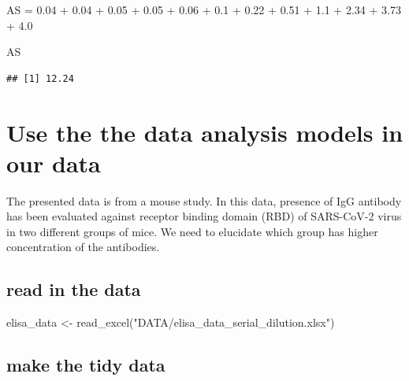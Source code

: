 \documentclass[
]{book}
\newenvironment{Shaded}{\begin{snugshade}}{\end{snugshade}}
\newcommand{\FloatTok}[1]{\textcolor[rgb]{0.00,0.00,0.81}{#1}}
\newcommand{\FunctionTok}[1]{\textcolor[rgb]{0.00,0.00,0.00}{#1}}
\newcommand{\NormalTok}[1]{#1}
\newcommand{\OtherTok}[1]{\textcolor[rgb]{0.56,0.35,0.01}{#1}}
\newcommand{\SpecialCharTok}[1]{\textcolor[rgb]{0.00,0.00,0.00}{#1}}
\newcommand{\StringTok}[1]{\textcolor[rgb]{0.31,0.60,0.02}{#1}}
\begin{document}
\begin{Shaded}
\begin{Highlighting}[]
\NormalTok{AS }\OtherTok{=} \FloatTok{0.04} \SpecialCharTok{+} \FloatTok{0.04} \SpecialCharTok{+} \FloatTok{0.05} \SpecialCharTok{+} \FloatTok{0.05} \SpecialCharTok{+} \FloatTok{0.06} \SpecialCharTok{+} \FloatTok{0.1} \SpecialCharTok{+} \FloatTok{0.22} \SpecialCharTok{+} \FloatTok{0.51} \SpecialCharTok{+} \FloatTok{1.1} \SpecialCharTok{+} \FloatTok{2.34} \SpecialCharTok{+} \FloatTok{3.73} \SpecialCharTok{+} \FloatTok{4.0}

\NormalTok{AS}
\end{Highlighting}
\end{Shaded}

\begin{verbatim}
## [1] 12.24
\end{verbatim}

\hypertarget{use-the-the-data-analysis-models-in-our-data}{%
\section{Use the the data analysis models in our data}\label{use-the-the-data-analysis-models-in-our-data}}

The presented data is from a mouse study. In this data, presence of IgG antibody has been evaluated against receptor binding domain (RBD) of SARS-CoV-2 virus in two different groups of mice. We need to elucidate which group has higher concentration of the antibodies.

\hypertarget{read-in-the-data}{%
\subsection{read in the data}\label{read-in-the-data}}

\begin{Shaded}
\begin{Highlighting}[]
\NormalTok{elisa\_data }\OtherTok{\textless{}{-}} \FunctionTok{read\_excel}\NormalTok{(}\StringTok{"DATA/elisa\_data\_serial\_dilution.xlsx"}\NormalTok{)}
\end{Highlighting}
\end{Shaded}

\hypertarget{make-the-tidy-data}{%
\subsection{make the tidy data}\label{make-the-tidy-data}}
\end{document}

